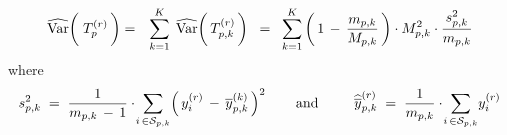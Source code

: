 
\begin{eqnarray*}
\widehat{\Var}\!\left(\;
	\overset{{\color{white}.}}{T^{(r)}_{p}}
	\,\right)
& = &
	\overset{K}{\underset{k=1}{\sum}}\;\,
	\widehat{\Var}\!\left(\,
		\overset{{\color{white}.}}{T^{(r)}_{p,k}}
		\,\right)
\;\; = \;\;
	\overset{K}{\underset{k=1}{\sum}}
	\left(\,1 \,-\, \dfrac{m_{p,k}}{M_{p,k}}\,\right)
	\cdot
	M_{p,k}^{2}
	\cdot
	\dfrac{s_{p,k}^{2}}{m_{p,k}}
\end{eqnarray*}
where
\begin{equation*}
s_{p,k}^{2}
\; = \;
	\dfrac{1}{m_{p,k}\,-\,1}
	\cdot\!
	\underset{i\,\in\mathcal{S}_{p,k}}{\sum}\!
	\left(\,y^{(r)}_{i} \,-\, \overline{y}^{(k)}_{p,k}\,\right)^{2}
\quad\quad
\textnormal{and}
\quad\quad\;\;
\widehat{\overline{y}}^{(r)}_{p,k}
\; = \;
	\dfrac{1}{m_{p,k}}
	\cdot\!
	\underset{i\,\in\mathcal{S}_{p,k}}{\sum}
	y^{(r)}_{i}
\end{equation*}
